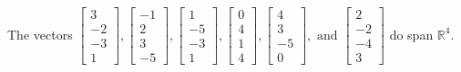 \begin{exercise}
\begin{exerciseStatement}
  \end{exerciseStatement}
  \begin{exerciseAnswer}
   The vectors \(\left[\begin{array}{r}
3 \\
-2 \\
-3 \\
1
\end{array}\right] , \left[\begin{array}{r}
-1 \\
2 \\
3 \\
-5
\end{array}\right] , \left[\begin{array}{r}
1 \\
-5 \\
-3 \\
1
\end{array}\right] , \left[\begin{array}{r}
0 \\
4 \\
1 \\
4
\end{array}\right] , \left[\begin{array}{r}
4 \\
3 \\
-5 \\
0
\end{array}\right] , \text{ and } \left[\begin{array}{r}
2 \\
-2 \\
-4 \\
3
\end{array}\right]\) 
  	 do  
	span \(\mathbb{R}^4\).
  


  \end{exerciseAnswer}
\end{exercise}